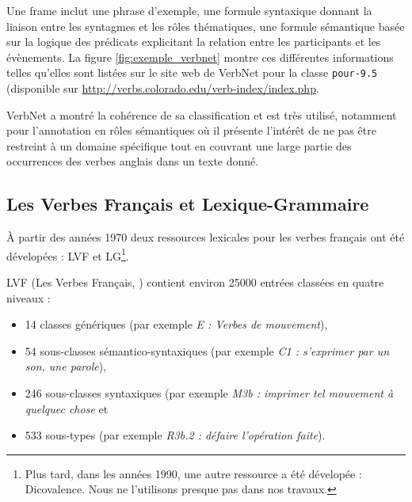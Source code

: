 Une frame inclut une phrase d'exemple, une formule syntaxique donnant la
liaison entre les syntagmes et les rôles thématiques, une formule sémantique
basée sur la logique des prédicats explicitant la relation entre les
participants et les évènements. La figure \ref{fig:exemple_verbnet} montre ces
différentes informations telles qu'elles sont listées sur le site web de
VerbNet pour la classe \texttt{pour-9.5} (disponible sur
\url{http://verbs.colorado.edu/verb-index/index.php}.


VerbNet a montré la cohérence de sa classification et est très utilisé,
notamment pour l'annotation en rôles sémantiques
\citep{swier2005exploiting,palmer2013semantic} où il présente l'intérêt de ne
pas être restreint à un domaine spécifique tout en couvrant une large partie
des occurrences des verbes anglais dans un texte donné.


\subsection{Les Verbes Français et Lexique-Grammaire}
\label{sec:lvflg}

À partir des années 1970 deux ressources lexicales pour les verbes français ont
été dévelopées : LVF et LG\footnote{Plus tard, dans les années 1990, une autre
    ressource a été dévelopée : Dicovalence. Nous ne l'utilisons presque pas
dans nos travaux.}.

LVF (Les Verbes Français, \cite{dubois1997verbes}) contient environ 25000
entrées classées en quatre niveaux :

\begin{itemize}

    \item 14 classes génériques (par exemple \textit{E : Verbes de mouvement}),

    \item 54 sous-classes sémantico-syntaxiques (par exemple \textit{C1 :
        s'exprimer par un son, une parole}),

    \item 246 sous-classes syntaxiques (par exemple \textit{M3b : imprimer tel
        mouvement à quelquec chose} et

    \item 533 sous-types (par exemple \textit{R3b.2 : défaire l'opération
        faite}).

\end{itemize}


